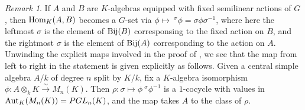 \documentclass[11pt]{amsart}
\numberwithin{equation}{section}
\theoremstyle{remark}
\newtheorem{remark}[equation]{Remark}
\theoremstyle{remark}
\theoremstyle{remark}
\theoremstyle{definition}
\theoremstyle{definition}
\theoremstyle{definition}
\theoremstyle{definition}
\theoremstyle{definition}
\theoremstyle{definition}
\begin{document}
\begin{remark} \label{action on homs}
If $A$ and $B$ are $K$-algebras equipped with fixed semilinear actions of $G$, then $\textup{Hom}_K(A,B)$ becomes a $G$-set via $\phi \mapsto ~^\sigma\phi=\sigma \phi \sigma^{-1}$, where here the leftmost $\sigma$ is the element of $\textup{Bij}(B)$ corresponsing to the fixed action on $B$, and the rightmost $\sigma$ is the element of $\textup{Bij}(A)$ corresponding to the action on $A$. Unwinding the explicit maps involved in the proof of , we see that the map from left to right in the statement is given explicitly as follows. Given a central simple algebra $A/k$ of degree $n$ split by $K/k$, fix a $K$-algebra  isomorphism $\phi:A\otimes_k K\stackrel{\sim}{\longrightarrow}M_n(K)$. Then $\rho:\sigma \mapsto \phi ~^\sigma \phi^{-1}$ is a $1$-cocycle with values in $\textup{Aut}_K(M_n(K))=PGL_n(K)$, and the map takes $A$ to the class of $\rho$.
\end{remark}
\end{document}
